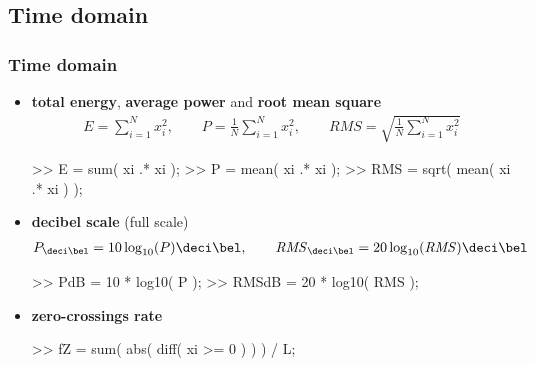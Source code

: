 
\subsection{Time domain}

\begin{frame}[fragile]
	\frametitle{Time domain}
	\begin{itemize}
		\item \textbf{total energy}, \textbf{average power} and \textbf{root mean square}
			\begin{align*}
				E=\sum_{i=1}^Nx_i^2,\qquad P=\frac1N\sum_{i=1}^Nx_i^2,\qquad\mathit{RMS}=\sqrt{\frac1N\sum_{i=1}^Nx_i^2}
			\end{align*}
			\begin{code}
>> E = sum( xi .* xi );
>> P = mean( xi .* xi );
>> RMS = sqrt( mean( xi .* xi ) );
			\end{code}
		\item \textbf{decibel scale} (full scale)
			\begin{align*}
				P_{\deci\bel}=10\log_{10}(P)\deci\bel,\qquad\mathit{RMS}_{\deci\bel}=20\log_{10}(\mathit{RMS})\deci\bel
			\end{align*}
			\begin{code}
>> PdB = 10 * log10( P );
>> RMSdB = 20 * log10( RMS );
			\end{code}
		\item \textbf{zero-crossings rate}
			\begin{code}
>> fZ = sum( abs( diff( xi >= 0 ) ) ) / L;
			\end{code}
	\end{itemize}
\end{frame}

